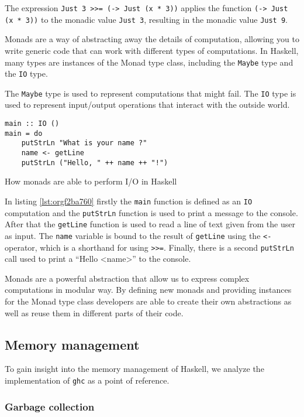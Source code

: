 \documentclass[a4paper, titlepage, twoside]{article}
\begin{document}
The expression \texttt{Just 3 >>= (\x -> Just (x * 3))} applies the function \texttt{(\x -> Just (x * 3))} to the monadic value \texttt{Just 3}, resulting in the monadic value \texttt{Just 9}.

Monads are a way of abstracting away the details of computation, allowing you to write generic code that can work with different types of computations. In Haskell, many types are instances of the Monad type class, including the \texttt{Maybe} type and the \texttt{IO} type.

The \texttt{Maybe} type is used to represent computations that might fail. The \texttt{IO} type is used to represent input/output operations that interact with the outside world.

\begin{listing}[htbp]
\begin{verbatim}
main :: IO ()
main = do
    putStrLn "What is your name ?"
    name <- getLine
    putStrLn ("Hello, " ++ name ++ "!")
\end{verbatim}
\caption{\label{lst:orgf2ba760}How monads are able to perform I/O in Haskell}
\end{listing}

In listing \ref{lst:orgf2ba760} firstly the \texttt{main} function is defined as an \texttt{IO} computation and the \texttt{putStrLn} function is used to print a message to the console. After that the \texttt{getLine} function is used to read a line of text given from the user as input. The \texttt{name} variable is bound to the result of \texttt{getLine} using the \texttt{<-} operator, which is a shorthand for using \texttt{>{}>{}=}. Finally, there is a second \texttt{putStrLn} call used to print a ``Hello <name>'' to the console.

Monads are a powerful abstraction that allow us to express complex computations in modular way. By defining new monads and providing instances for the Monad type class developers are able to create their own abstractions as well as reuse them in different parts of their code.

\subsection{Memory management}
\label{sec:org9504df4}

To gain insight into the memory management of Haskell, we analyze the implementation of \texttt{ghc} as a point of reference.

\subsubsection{Garbage collection}
\label{sec:orge5c751e}
\end{document}
